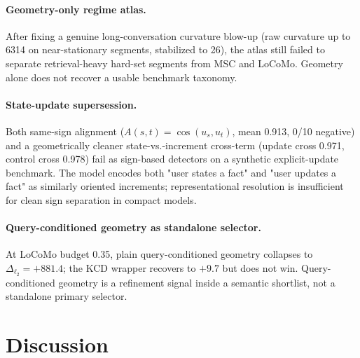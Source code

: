 \documentclass[conference]{IEEEtran}
\newcommand{\Logit}{\Delta_{\ell_2}}
\begin{document}
\paragraph{Geometry-only regime atlas.} After fixing a genuine long-conversation curvature blow-up (raw curvature up to 6314 on near-stationary segments, stabilized to 26), the atlas still failed to separate retrieval-heavy hard-set segments from MSC and LoCoMo. Geometry alone does not recover a usable benchmark taxonomy.

\paragraph{State-update supersession.} Both same-sign alignment ($A(s,t) = \cos(u_s, u_t)$, mean 0.913, 0/10 negative) and a geometrically cleaner state-vs.-increment cross-term (update cross 0.971, control cross 0.978) fail as sign-based detectors on a synthetic explicit-update benchmark. The model encodes both "user states a fact" and "user updates a fact" as similarly oriented increments; representational resolution is insufficient for clean sign separation in compact models.

\paragraph{Query-conditioned geometry as standalone selector.} At LoCoMo budget 0.35, plain query-conditioned geometry collapses to $\Logit = +881.4$; the KCD wrapper recovers to $+9.7$ but does not win. Query-conditioned geometry is a refinement signal inside a semantic shortlist, not a standalone primary selector.

\section{Discussion}
\end{document}
